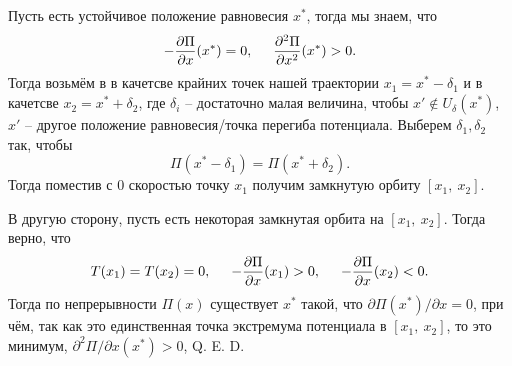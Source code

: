Пусть есть устойчивое положение равновесия $x^*$, тогда мы знаем, что
\begin{equation*}
    -\frac{\partial \Pi}{\partial x} (x^*) = 0, \hspace{0.5cm} \frac{\partial^2 \Pi}{\partial x^2} (x^*) > 0.
\end{equation*}
Тогда возьмём в в качетсве крайних точек нашей траектории $x_1 = x^* - \delta_1$ и в качетсве $x_2 = x^* + \delta_2$, где $\delta_i$ -- достаточно малая величина, чтобы $x' \notin U_\delta (x^*)$, $x' $ -- другое положение равновесия/точка перегиба потенциала. Выберем $\delta_1, \delta_2$ так, чтобы
\begin{equation*}
    \Pi(x^* - \delta_1) = \Pi(x^* + \delta_2).
\end{equation*}
Тогда поместив с 0 скоростью точку $x_1$ получим замкнутую орбиту $[x_1, \ x_2]$.

В другую сторону, пусть есть некоторая замкнутая орбита на $[x_1, \ x_2]$. Тогда верно, что
\begin{equation*}
    T(x_1) = T(x_2) = 0, \hspace{0.5cm} 
    -\frac{\partial \Pi}{\partial x} (x_1) > 0, \hspace{0.5cm} 
    -\frac{\partial \Pi}{\partial x} (x_2) < 0.
\end{equation*}
Тогда по непрерывности $\Pi(x)$ существует $x^*$ такой, что $\partial \Pi(x^*) / \partial x = 0$, при чём, так как это единственная точка экстремума потенциала в $[x_1, \ x_2]$, то это минимум, $\partial^2 \Pi / \partial x (x^*) > 0$, Q. E. D.